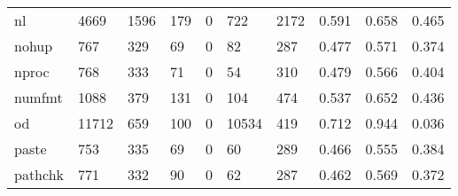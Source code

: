 \begin{longtable}{lp{1.3cm}p{1.3cm}p{1.3cm}p{1.3cm}p{1.3cm}p{1.3cm}p{1.3cm}p{1.3cm}p{1.3cm}}
nl        &                   4669 &                               1596 &                               179 &                                0 &                               722 &                            2172 &                                0.591 &                                  0.658 &                                0.465 \\
nohup     &                    767 &                                329 &                                69 &                                0 &                                82 &                             287 &                                0.477 &                                  0.571 &                                0.374 \\
nproc     &                    768 &                                333 &                                71 &                                0 &                                54 &                             310 &                                0.479 &                                  0.566 &                                0.404 \\
numfmt    &                   1088 &                                379 &                               131 &                                0 &                               104 &                             474 &                                0.537 &                                  0.652 &                                0.436 \\
od        &                  11712 &                                659 &                               100 &                                0 &                             10534 &                             419 &                                0.712 &                                  0.944 &                                0.036 \\
paste     &                    753 &                                335 &                                69 &                                0 &                                60 &                             289 &                                0.466 &                                  0.555 &                                0.384 \\
pathchk   &                    771 &                                332 &                                90 &                                0 &                                62 &                             287 &                                0.462 &                                  0.569 &                                0.372 \\

\end{longtable}
